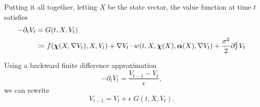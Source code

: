 \documentclass[../../main.tex]{subfiles}
\begin{document}
Putting it all together, letting $X$ be the state vector, the value function at time $t$ satisfies \begin{equation}
    \begin{split}
        -\partial_t V_t &= G(t, X, V_t) \\
        &\coloneqq f(\bm{\chi}(X, \nabla V_t), X, V_t) + \nabla V_t \cdot w(t, X, \bm{\chi}(X), \bm{\alpha}(X),  \nabla V_t) + \frac{\sigma^2}{2} \partial_{T}^2 V_t
    \end{split}
\end{equation}

Using a backward finite difference approximation \begin{equation}
    -\partial_t V_t = \frac{V_{t - 1} - V_{t}}{\epsilon},
\end{equation} we can rewrite \begin{equation}
    V_{t - 1} = V_t + \epsilon \; G(t, X, V_t).
\end{equation}
\end{document}
